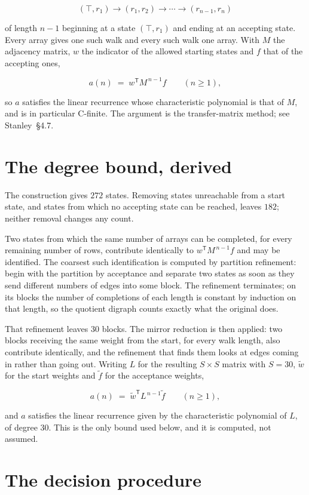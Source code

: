 \documentclass[11pt]{article}
\theoremstyle{definition}
\begin{document}
\[(\top,r_1) \to (r_1,r_2) \to \cdots \to (r_{n-1},r_n)\]

of length $n-1$ beginning at a state $(\top,r_1)$ and ending at an accepting state. Every array gives one such walk and every such walk one array. With $M$ the adjacency matrix, $w$ the indicator of the allowed starting states and $f$ that of the accepting ones,

\[a(n) \;=\; w^{\mathsf T} M^{\,n-1} f \qquad (n \ge 1),\]

so $a$ satisfies the linear recurrence whose characteristic polynomial is that of $M$, and is in particular C-finite. The argument is the transfer-matrix method; see Stanley~\S4.7.

\section{The degree bound, derived}

The construction gives $272$ states. Removing states unreachable from a start state, and states from which no accepting state can be reached, leaves $182$; neither removal changes any count.

Two states from which the same number of arrays can be completed, for every remaining number of rows, contribute identically to $w^{\mathsf T}M^{\,n-1}f$ and may be identified. The coarsest such identification is computed by partition refinement: begin with the partition by acceptance and separate two states as soon as they send different numbers of edges into some block. The refinement terminates; on its blocks the number of completions of each length is constant by induction on that length, so the quotient digraph counts exactly what the original does.

That refinement leaves $30$ blocks. The mirror reduction is then applied: two blocks receiving the same weight from the start, for every walk length, also contribute identically, and the refinement that finds them looks at edges coming in rather than going out. Writing $L$ for the resulting $S \times S$ matrix with $S = 30$, $\tilde w$ for the start weights and $\tilde f$ for the acceptance weights,

\[a(n) \;=\; \tilde w^{\mathsf T} L^{\,n-1} \tilde f \qquad (n \ge 1),\]

and $a$ satisfies the linear recurrence given by the characteristic polynomial of $L$, of degree $30$. This is the only bound used below, and it is computed, not assumed.

\section{The decision procedure}
\end{document}
